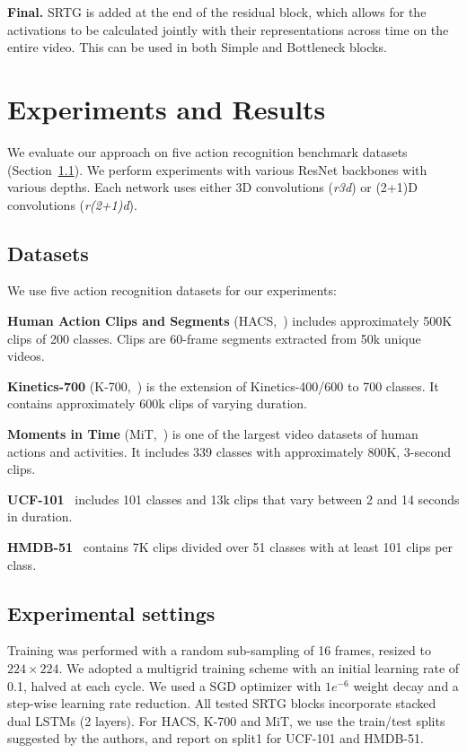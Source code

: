 \documentclass[final,5p,times,twocolumn]{elsarticle}
\begin{document}
\textbf{Final.} SRTG is added at the end of the residual block, which allows for the activations to be calculated jointly with their representations across time on the entire video. This can be used in both Simple and Bottleneck blocks.



\section{Experiments and Results}
\label{sec:results}
We evaluate our approach on five action recognition benchmark datasets (Section~\ref{subsec:datasets}). We perform experiments with various ResNet backbones with various depths. Each network uses either 3D convolutions (\textit{r3d}) or (2+1)D convolutions (\textit{r(2+1)d}).

\subsection{Datasets} \label{subsec:datasets}
We use five action recognition datasets for our experiments:

\textbf{Human Action Clips and Segments} (HACS,~\cite{zhao2019hacs}) includes approximately 500K clips of 200 classes. Clips are 60-frame segments extracted from 50k unique videos.

\textbf{Kinetics-700} (K-700,~\cite{carreira2019short}) is the extension of Kinetics-400/600 to 700 classes. It contains approximately 600k clips of varying duration. 

\textbf{Moments in Time} (MiT,~\cite{monfort2018moments}) is one of the largest video datasets of human actions and activities. It includes 339 classes with approximately 800K, 3-second clips.

\textbf{UCF-101}~\citep{soomro2012ucf101} includes 101 classes and 13k clips that vary between 2 and 14 seconds in duration.

\textbf{HMDB-51}~\citep{kuehne2011hmdb} contains 7K clips divided over 51 classes with at least 101 clips per class.


\subsection{Experimental settings}

Training was performed with a random sub-sampling of 16 frames, resized to $224 \times 224$. We adopted a multigrid training scheme \citep{wu2019multigrid} with an initial learning rate of 0.1, halved at each cycle. We used a SGD optimizer with $1e^{-6}$ weight decay and a step-wise learning rate reduction. All tested SRTG blocks incorporate stacked dual LSTMs (2 layers). For HACS, K-700 and MiT, we use the train/test splits suggested by the authors, and report on split1 for UCF-101 and HMDB-51.
\end{document}
